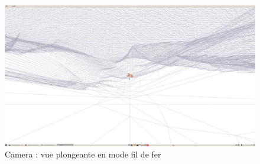 \documentclass{report}
\begin{document}
\begin{figure}[hbtp]
\caption{Camera : vue plongeante en mode fil de fer}
\centering
\includegraphics[scale=0.2]{./images/4.png}
\end{figure}
\end{document}

